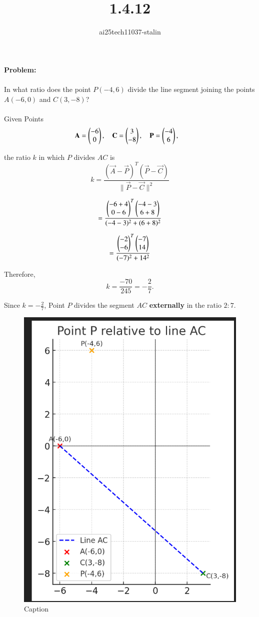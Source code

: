 \documentclass[journal]{IEEEtran}
\begin{document}

\vspace{3cm}

\title{1.4.12}
\author{ai25tech11037-stalin}
\maketitle
{\let\newpage\relax\maketitle}

\renewcommand{\thefigure}{\theenumi}
\renewcommand{\thetable}{\theenumi}
\setlength{\intextsep}{10pt} %

\renewcommand{\thetable}{\theenumi}

\textbf{Problem:} \\ 
\\
In what ratio does the point \( P(-4, 6) \) divide the line segment joining the points \( A(-6, 0) \) and \( C(3, -8) \)? 
\\

\solution\\

Given Points
\begin{align*}
\mathbf{A} &= \begin{pmatrix}-6 \\ 0\end{pmatrix}, \quad
\mathbf{C} =  \begin{pmatrix}3 \\ -8\end{pmatrix}, \quad
\mathbf{P} = \begin{pmatrix}-4 \\ 6\end{pmatrix},
\end{align*}

the ratio \( k \) in which \( P \) divides \( AC \) is
\[
k = \frac{(\vec{A} - \vec{P})^T (\vec{P} - \vec{C})}{\|\vec{P} - \vec{C}\|^2}
\]

\[
=\frac{
 \begin{pmatrix}-6 + 4 \\ 0 - 6\end{pmatrix}^T 
 \begin{pmatrix}-4 - 3 \\ 6 + 8\end{pmatrix}
}{
(-4 - 3)^2 + (6 + 8)^2
}
\]

\[
=\frac{
 \begin{pmatrix}-2 \\ -6\end{pmatrix}^T
 \begin{pmatrix}-7 \\ 14\end{pmatrix}
}{
(-7)^2 + 14^2
}
\]

Therefore,
\[
k = \frac{-70}{245} = -\frac{2}{7}.
\]

Since \( k = -\frac{2}{7} \), Point \( P \) divides the segment \( AC \) \textbf{externally} in the ratio \( 2 : 7 \).

\begin{figure}
    \centering
    \includegraphics[width=0.3\linewidth]{Fig1.png}
    \caption{Caption}
    \label{fig:placeholder}
\end{figure}
\end{document}
